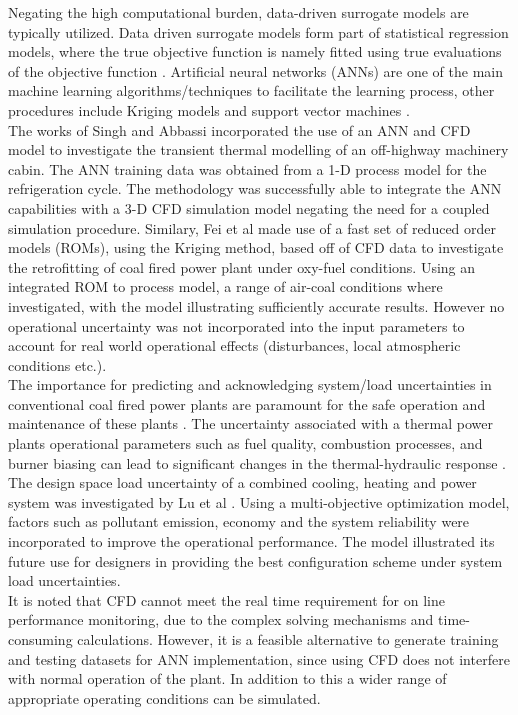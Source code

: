 \documentclass[a4paper,fleqn]{cas-sc}
\begin{document}
Negating the high computational burden, data-driven surrogate models are typically utilized. Data driven surrogate models form part of statistical regression models, where the true objective function is namely fitted using true evaluations of the objective function \cite{Wheeler2019}. Artificial neural networks (ANNs) are one of the main machine learning algorithms/techniques to facilitate the learning process, other procedures include Kriging models \cite{Fei2015} and support vector machines \cite{Lv2017}.\\

The works of Singh and Abbassi \cite{Singh2018} incorporated the use of an ANN and CFD model to investigate the transient thermal modelling of an off-highway machinery cabin. The ANN training data was obtained from a 1-D process model for the refrigeration cycle. The methodology was successfully able to integrate the ANN capabilities with a 3-D CFD simulation model negating the need for a coupled simulation procedure. Similary, Fei et al \cite{Fei2015} made use of a fast set of reduced order models (ROMs), using the Kriging method, based off of CFD data to investigate the retrofitting of coal fired power plant under oxy-fuel conditions. Using an integrated ROM to process model, a range of air-coal conditions where investigated, with the model illustrating sufficiently accurate results. However no operational uncertainty was not incorporated into the input parameters to account for real world operational effects (disturbances, local atmospheric conditions etc.).\\

The importance for predicting and acknowledging system/load uncertainties in conventional coal fired power plants are paramount for the safe operation and maintenance of these plants \cite{Madejski_18}. The uncertainty associated with a thermal power plants operational parameters such as fuel quality, combustion processes, and  burner biasing can lead to significant changes in the thermal-hydraulic response \cite{Sarkar2015}. The design space load uncertainty of a combined cooling, heating and power system was investigated by Lu et al \cite{Lu2021}. Using a multi-objective optimization model, factors such as pollutant emission, economy and the system reliability were incorporated to improve the operational performance. The model illustrated its future use for designers in providing the best configuration scheme under system load uncertainties.\\ 

It is noted that CFD cannot meet the real time requirement for on line performance monitoring, due to the complex solving mechanisms and time-consuming calculations. However, it is a feasible alternative to generate training and testing datasets for ANN implementation, since using CFD does not interfere with normal operation of the plant. In addition to this a wider range of appropriate operating conditions can be simulated.\\
 
\end{document}
